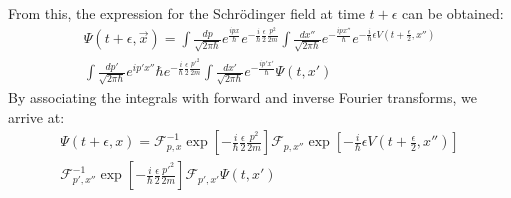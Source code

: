 \documentclass[12pt]{article}
\begin{document}
From this, the expression for the Schrödinger field at time \( t+\epsilon \) can be obtained:
\begin{multline}
    \Psi(t+\epsilon,\vec{x})=\int\frac{dp}{\sqrt{2\pi\hbar}}e^{\frac{ipx}{\hbar}}e^{-\frac{i}{\hbar}\frac{\epsilon}{2}\frac{p^2}{2m}}\int\frac{dx''}{\sqrt{2\pi\hbar}}e^{-\frac{ipx''}{\hbar}}e^{-\frac{i}{\hbar}\epsilon V\left(t+\frac{\epsilon}{2},x''\right)} \\ \int \frac{dp'}{\sqrt{2\pi \hbar}}e^{ip'x''}{\hbar}e^{-\frac{i}{\hbar}\frac{\epsilon}{2}\frac{p'^2}{2m}}\int \frac{dx'}{\sqrt{2\pi \hbar}}e^{-\frac{ip'x'}{\hbar}}\Psi(t,x')
\end{multline}
By associating the integrals with forward and inverse Fourier transforms, we arrive at:
\begin{multline}
    \Psi(t+\epsilon,x)=\mathcal{F}_{p,x}^{-1}\exp\left[-\frac{i}{\hbar}\frac{\epsilon}{2}\frac{p^2}{2m} \right] \mathcal{F}_{p,x''}\exp\left[-\frac{i}{\hbar}\epsilon V\left(t+\frac{\epsilon}{2},x'' \right) \right] \\ \mathcal{F}_{p',x''}^{-1}\exp \left[-\frac{i}{\hbar}\frac{\epsilon}{2}\frac{p'^2}{2m} \right] \mathcal{F}_{p',x'}\Psi(t,x')
\end{multline}



\end{document}
